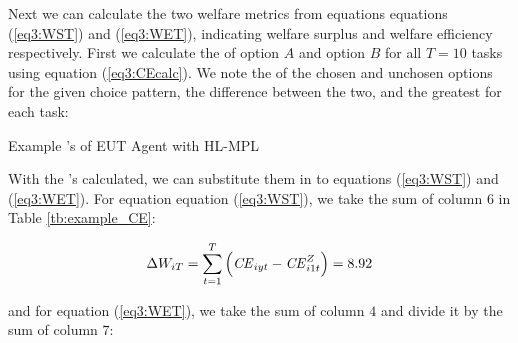 \documentclass[../main.tex]{subfiles}
\begin{document}
\noindent Next we can calculate the two welfare metrics from equations equations (\ref{eq3:WST}) and (\ref{eq3:WET}), indicating welfare surplus and welfare efficiency respectively.
First we calculate the {\CE} of option $A$ and option $B$ for all $T = 10$ tasks using equation (\ref{eq3:CEcalc}).
We note the {\CE} of the chosen and unchosen options for the given choice pattern, the difference between the two, and the greatest {\CE} for each task:

\begin{table}[ht]
	\centering
	\setlength{\tabcolsep}{1pt}
	\caption{ Example {\CE}'s of EUT Agent with HL-MPL}
	\label{tb:example_CE}
	\begin{adjustbox}{width=1\textwidth}
	\end{adjustbox}
\end{table}

With the {\CE}'s calculated, we can substitute them in to equations (\ref{eq3:WST}) and (\ref{eq3:WET}).
For equation equation (\ref{eq3:WST}), we take the sum of column $6$ in Table \ref{tb:example_CE}:

\begin{equation}
	\label{eq3:example_WST}
	\Delta W_{iT} = \sum_{t=1}^T \left( {\mathit{CE}}_{iyt} - {\mathit{CE}}_{i1t}^Z \right) = 8.92
\end{equation}

\noindent and for equation (\ref{eq3:WET}), we take the sum of column $4$ and divide it by the sum of column $7$:
\end{document}
